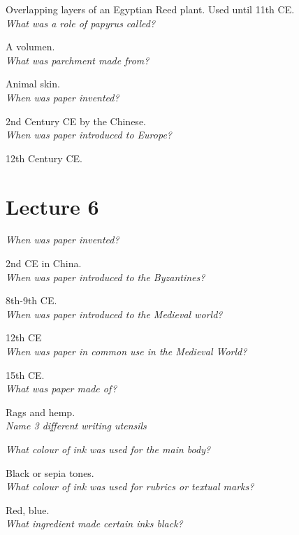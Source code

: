 \documentclass[12pt]{article}
\begin{document}
Overlapping layers of an Egyptian Reed plant. Used until 11th CE. \\

\textit{What was a role of papyrus called?}

A volumen.\\

\textit{What was parchment made from?}

Animal skin.\\

\textit{When was paper invented?}

2nd Century CE by the Chinese.\\

\textit{When was paper introduced to Europe?}

12th Century CE.\\

\section*{Lecture 6}

\textit{When was paper invented?}

2nd CE in China.\\

\textit{When was paper introduced to the Byzantines?}

8th-9th CE.\\

\textit{When was paper introduced to the Medieval world?}

12th CE\\

\textit{When was paper in common use in the Medieval World?}

15th CE.\\

\textit{What was paper made of?}

Rags and hemp.\\

\textit{Name 3 different writing utensils}



\textit{What colour of ink was used for the main body?}

Black or sepia tones.\\

\textit{What colour of ink was used for rubrics or textual marks?}

Red, blue.\\

\textit{What ingredient made certain inks black?}
\end{document}
